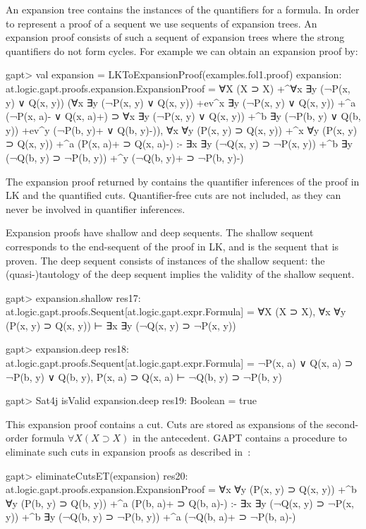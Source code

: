 \documentclass[a4paper,11pt]{book}
\newcommand{\impl}{\supset} %
\newcommand{\cli}[1]{{\ttfamily {#1}}}
\begin{document}
An expansion tree contains the instances of the quantifiers for a formula.  In order
to represent a proof of a sequent we use sequents of expansion trees.  An
expansion proof consists of such a sequent of expansion trees where the
strong quantifiers do not form cycles.
For example we can obtain an expansion proof by:
\begin{clilisting}
gapt> val expansion = LKToExpansionProof(examples.fol1.proof)
expansion: at.logic.gapt.proofs.expansion.ExpansionProof =
∀X (X ⊃ X)
  +^{∀x ∃y (¬P(x, y) ∨ Q(x, y))}
    (∀x ∃y (¬P(x, y) ∨ Q(x, y)) +ev^{x}
        ∃y (¬P(x, y) ∨ Q(x, y))
        +^{a} (¬P(x, a)- ∨ Q(x, a)+) ⊃
      ∀x ∃y (¬P(x, y) ∨ Q(x, y))
        +^{b} ∃y (¬P(b, y) ∨ Q(b, y)) +ev^{y} (¬P(b, y)+ ∨ Q(b, y)-)),
∀x ∀y (P(x, y) ⊃ Q(x, y))
  +^{x} ∀y (P(x, y) ⊃ Q(x, y)) +^{a} (P(x, a)+ ⊃ Q(x, a)-)
:-
∃x ∃y (¬Q(x, y) ⊃ ¬P(x, y))
  +^{b} ∃y (¬Q(b, y) ⊃ ¬P(b, y)) +^{y} (¬Q(b, y)+ ⊃ ¬P(b, y)-)

\end{clilisting}

The expansion proof returned by \cli{LKToExpansionProof} contains the
quantifier inferences of the proof in LK and the quantified cuts.
Quantifier-free cuts are not included, as they can never be involved in
quantifier inferences.

Expansion proofs have shallow and deep sequents.  The shallow sequent
corresponds to the end-sequent of the proof in LK, and is the sequent that is
proven.  The deep sequent consists of instances of the shallow sequent: the
(quasi-)tautology of the deep sequent implies the validity of the shallow
sequent.
\begin{clilisting}
gapt> expansion.shallow
res17: at.logic.gapt.proofs.Sequent[at.logic.gapt.expr.Formula] = ∀X (X ⊃ X), ∀x ∀y (P(x, y) ⊃ Q(x, y)) ⊢ ∃x ∃y (¬Q(x, y) ⊃ ¬P(x, y))

gapt> expansion.deep
res18: at.logic.gapt.proofs.Sequent[at.logic.gapt.expr.Formula] = ¬P(x, a) ∨ Q(x, a) ⊃ ¬P(b, y) ∨ Q(b, y), P(x, a) ⊃ Q(x, a) ⊢ ¬Q(b, y) ⊃ ¬P(b, y)

gapt> Sat4j isValid expansion.deep
res19: Boolean = true

\end{clilisting}

This expansion proof contains a cut.  Cuts are stored as expansions of the
second-order formula $\forall X (X \impl X)$ in the antecedent.  GAPT contains
a procedure to eliminate such cuts in expansion proofs as described
in~\cite{Hetzl2013Expansion}:
\begin{clilisting}
gapt> eliminateCutsET(expansion)
res20: at.logic.gapt.proofs.expansion.ExpansionProof =
∀x ∀y (P(x, y) ⊃ Q(x, y))
  +^{b} ∀y (P(b, y) ⊃ Q(b, y)) +^{a} (P(b, a)+ ⊃ Q(b, a)-)
:-
∃x ∃y (¬Q(x, y) ⊃ ¬P(x, y))
  +^{b} ∃y (¬Q(b, y) ⊃ ¬P(b, y)) +^{a} (¬Q(b, a)+ ⊃ ¬P(b, a)-)

\end{clilisting}
\end{document}
